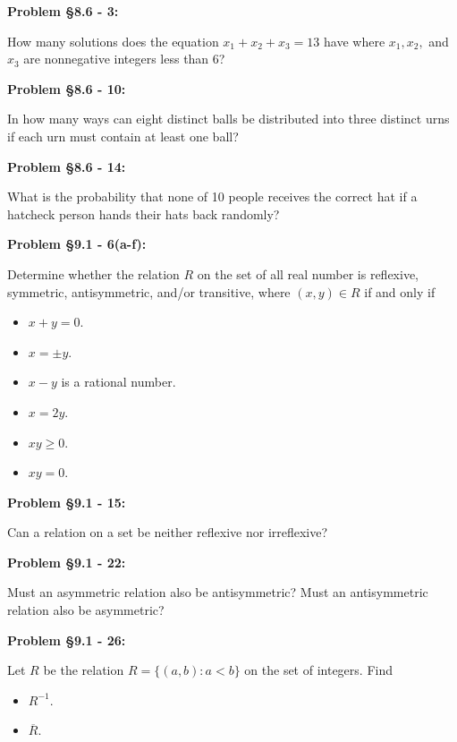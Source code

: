 \documentclass{article}
\newenvironment{problem}[1]
    {\begin{mdframed}[default]
    \textbf{Problem #1:}
    }
    {\end{mdframed}
    }
\begin{document}
\begin{problem}{\S 8.6 - 3}
How many solutions does the equation $x_1 + x_2 + x_3 = 13$ have where $x_1, x_2,$ and $x_3$ are nonnegative integers less than 6?
\end{problem}

\begin{problem}{\S 8.6 - 10}
In how many ways can eight distinct balls be distributed into three distinct urns if each urn must contain at least one ball?
\end{problem}

\begin{problem}{\S 8.6 - 14}
What is the probability that none of 10 people receives the correct hat if a hatcheck person hands their hats back randomly?
\end{problem}

\begin{problem}{\S 9.1 - 6(a-f)}
Determine whether the relation $R$ on the set of all real number is reflexive, symmetric, antisymmetric, and/or transitive, where $(x,y) \in R$ if and only if
\begin{itemize}
    \item[(a)] $x+y = 0$.
    \item[(b)] $x = \pm y$.
    \item[(c)] $x-y$ is a rational number.
    \item[(d)] $x = 2y$.
    \item[(e)] $xy \geq 0$.
    \item[(f)] $xy = 0$.
\end{itemize}
\end{problem}

\begin{problem}{\S 9.1 - 15}
Can a relation on a set be neither reflexive nor irreflexive?
\end{problem}

\begin{problem}{\S 9.1 - 22}
Must an asymmetric relation also be antisymmetric? Must an antisymmetric relation also be asymmetric?
\end{problem}

\begin{problem}{\S 9.1 - 26}
Let $R$ be the relation $R = \{ (a,b) : a < b \}$ on the set of integers. Find
\begin{itemize}
    \item[(a)] $R^{-1}$.
    \item[(b)] $\overline{R}$.
\end{itemize}
\end{problem}
\end{document}
